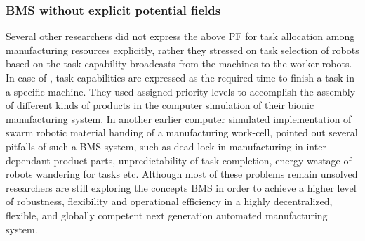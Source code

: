\subsubsection*{BMS without explicit potential fields}
Several other researchers did not express the above PF for task allocation among manufacturing resources explicitly, rather they stressed on task selection of robots based on the task-capability broadcasts from the machines to the worker robots. In case of \cite{Lazinica+2007}, task capabilities are expressed as the required time to finish a task in a specific machine. They used assigned priority levels to accomplish the assembly of different kinds of products in the computer simulation of their bionic manufacturing system. In another earlier computer simulated implementation of swarm robotic material handing of a manufacturing work-cell, \cite{Doty+1993} pointed out several pitfalls of such a BMS system, such as dead-lock in manufacturing in inter-dependant product parts, unpredictability of task completion, energy wastage of robots wandering for tasks etc. Although most of these problems remain unsolved researchers are still exploring the concepts BMS in order to achieve a higher level of robustness, flexibility and operational efficiency in a highly decentralized, flexible, and globally competent next generation automated manufacturing system.
